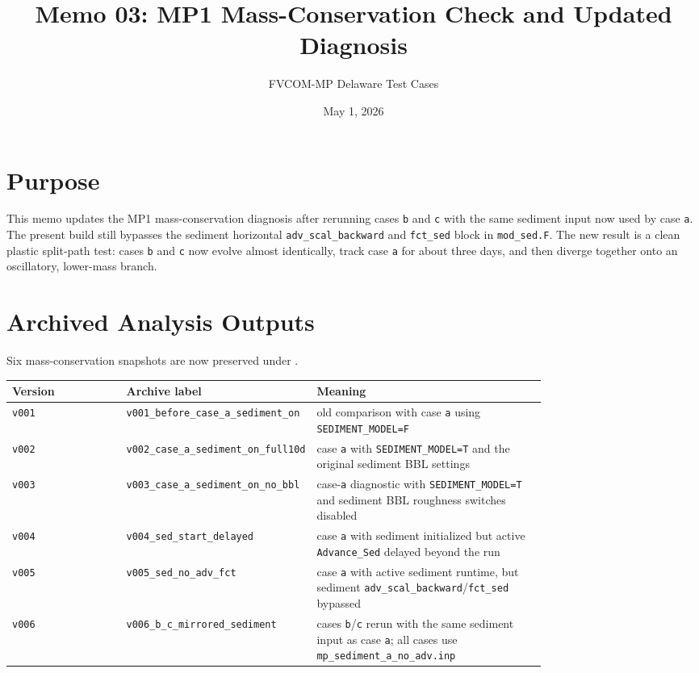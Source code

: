 \documentclass[11pt]{article}
\title{Memo 03: MP1 Mass-Conservation Check and Updated Diagnosis}
\author{FVCOM-MP Delaware Test Cases}
\date{May 1, 2026}
\begin{document}
\sloppy
\maketitle

\section*{Purpose}
This memo updates the MP1 mass-conservation diagnosis after rerunning cases
\texttt{b} and \texttt{c} with the same sediment input now used by case
\texttt{a}.  The present build still bypasses the sediment horizontal
\texttt{adv\_scal\_backward} and \texttt{fct\_sed} block in \texttt{mod\_sed.F}.
The new result is a clean plastic split-path test: cases \texttt{b} and
\texttt{c} now evolve almost identically, track case \texttt{a} for about three
days, and then diverge together onto an oscillatory, lower-mass branch.

\section*{Archived Analysis Outputs}
Six mass-conservation snapshots are now preserved under
.

\begin{table}[h]
\centering
\small
\begin{tabular}{lp{0.34\linewidth}p{0.43\linewidth}}
\toprule
Version & Archive label & Meaning \\
\midrule
\texttt{v001} & \texttt{v001\_before\_case\_a\_sediment\_on} &
old comparison with case \texttt{a} using \texttt{SEDIMENT\_MODEL=F} \\
\texttt{v002} & \texttt{v002\_case\_a\_sediment\_on\_full10d} &
case \texttt{a} with \texttt{SEDIMENT\_MODEL=T} and the original sediment BBL
settings \\
\texttt{v003} & \texttt{v003\_case\_a\_sediment\_on\_no\_bbl} &
case-\texttt{a} diagnostic with \texttt{SEDIMENT\_MODEL=T} and sediment BBL
roughness switches disabled \\
\texttt{v004} & \texttt{v004\_sed\_start\_delayed} &
case \texttt{a} with sediment initialized but active \texttt{Advance\_Sed}
delayed beyond the run \\
\texttt{v005} & \texttt{v005\_sed\_no\_adv\_fct} &
case \texttt{a} with active sediment runtime, but sediment
\texttt{adv\_scal\_backward}/\texttt{fct\_sed} bypassed \\
\texttt{v006} & \texttt{v006\_b\_c\_mirrored\_sediment} &
cases \texttt{b}/\texttt{c} rerun with the same sediment input as case
\texttt{a}; all cases use \texttt{mp\_sediment\_a\_no\_adv.inp} \\
\bottomrule
\end{tabular}
\end{table}
\end{document}
